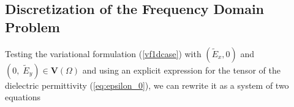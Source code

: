 



\subsection{Discretization of the Frequency Domain Problem}
\label{sec:discr}
Testing the variational formulation (\ref{vf1dcase}) with $(\tilde E_x,0)$ and $(0,\; \tilde{E}_y)\in\mathbf{V}(\Omega)$ and using 
an explicit expression for the tensor of the dielectric permittivity (\ref{eq:epsilon_0}), we can rewrite it as a system of two equations

